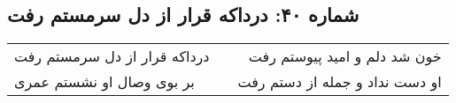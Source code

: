 \begin{center}
\section*{شماره ۴۰: درداکه قرار از دل سرمستم رفت}
\label{sec:040}
\begin{longtable}{l p{0.5cm} r}
درداکه قرار از دل سرمستم رفت
&&
خون شد دلم و امید پیوستم رفت
\\
بر بوی وصال او نشستم عمری
&&
او دست نداد و جمله از دستم رفت
\\
\end{longtable}
\end{center}
